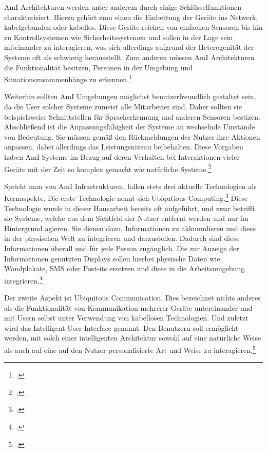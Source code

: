 AmI Architekturen werden unter anderem durch einige Schlüsselfunktionen charakterisiert. Hierzu gehört zum einen die Einbettung der Geräte ins Netwerk, kabelgebunden oder kabellos. Diese Geräte reichen von einfachen Sensoren bis hin zu Kontrollsystemen wie Sicherheitssystemen und sollen in der Lage sein miteinander zu interagieren, was sich allerdings aufgrund der Heterogenität der Systeme oft als schwierig herausstellt. Zum anderen müssen AmI Architekturen die Funktionalität besitzen, Personen in der Umgebung und Situationszusammenhänge zu erkennen.\footcite[Vgl.][Seite 585]{SpecialIssue}

Weiterhin sollten AmI Umgebungen möglichst benutzerfreundlich gestaltet sein, da die User solcher Systeme zumeist alle Mitarbeiter sind. Daher sollten sie beispielsweise Schnittstellen für Spracherkennung und anderen Sensoren bestizen. Abschließend ist die Anpassungsfähigkeit der Systeme an wechselnde Umstände von Bedeutung. Sie müssen gemäß den Rückmeldungen der Nutzer ihre Aktionen anpassen, dabei allerdings das Leistungsniveau beibehalten. Diese Vorgaben haben AmI Systeme im Bezug auf deren Verhalten bei Interaktionen vieler Geräte mit der Zeit so komplex gemacht wie natürliche Systeme.\footcite[Vgl.][Seite 586]{SpecialIssue}

Spricht man von AmI Infrastrukturen, fallen stets drei aktuelle Technologien als Kernaspekte. Die erste Technologie nennt sich Ubiqutious Computing.\footcite[Vgl.][Seite 1]{amiblabla} Diese Technologie wurde in dieser Hausarbeit bereits oft aufgeführt, und zwar betrifft sie Systeme, welche aus dem Sichtfeld der Nutzer entfernt werden und nur im Hintergrund agieren. Sie dienen dazu, Informationen zu akkumulieren und diese in der physischen Welt zu integrieren und darzustellen. Dadurch sind diese Informationen überall und für jede Person zugänglich. Die zur Anzeige der Informationen genutzten Displays sollen hierbei physische Daten wie Wandplakate, SMS oder Post-its ersetzen und diese in die Arbeitsumgebung integrieren.\footcite[Vgl.][Seite 71]{weiser}

Der zweite Aspekt ist Ubiquitous Communication. Dies bezeichnet nichts anderes als die Funktionalität von Kommunikation mehrerer Geräte untereinander und mit Usern selbst unter Verwendung von kabellosen Technologien. Und zuletzt wird das Intelligent User Interface genannt. Den Benutzern soll ermöglicht werden, mit solch einer intelligenten Architektur sowohl auf eine natürliche Weise als auch auf eine auf den Nutzer personalisierte Art und Weise zu interagieren.\footcite[Vgl.][Seite 1]{amiblabla}

